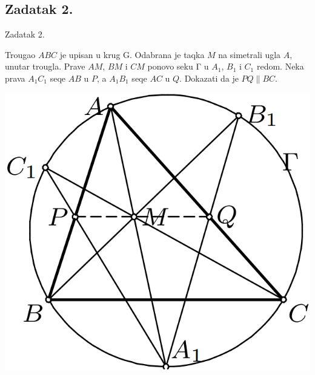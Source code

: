 \documentclass{beamer}
\begin{document}
\subsection{Zadatak 2.}
\begin{frame}{Zadatak 2.}
\begin{block}{}
Trougao $ABC$ je upisan u krug G. Odabrana je taqka $M$ na simetrali ugla $A$, unutar
trougla. Prave $AM$, $BM$ i $CM$ ponovo seku Γ u $A_1$, $B_1$ i $C_1$ redom. Neka prava $A_1C_1$
seqe $AB$ u $P$, a $A_1B_1$ seqe $AC$ u $Q$. Dokazati da je $PQ\parallel BC$.
\end{block}
\centering \includegraphics[scale=0.24]{Paskal2}
\end{frame}
\end{document}
